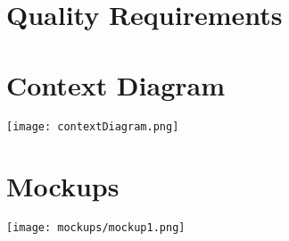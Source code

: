 \documentclass{article}
\begin{document}
\section{Quality Requirements}


\section{Context Diagram}
\texttt{[image: contextDiagram.png]}

\section{Mockups}
\texttt{[image: mockups/mockup1.png]}
\end{document}
